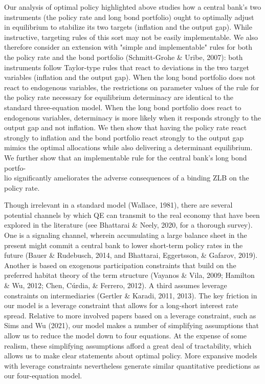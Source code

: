\documentclass[10pt]{article}
\begin{document}
Our analysis of optimal policy highlighted above studies how a central bank's two instruments (the policy rate and long bond portfolio) ought to optimally adjust in equilibrium to stabilize its two targets (inflation and the output gap). While instructive, targeting rules of this sort may not be easily implementable. We also therefore consider an extension with "simple and implementable" rules for both the policy rate and the bond portfolio (Schmitt-Grohe \& Uribe, 2007): both instruments follow Taylor-type rules that react to deviations in the two target variables (inflation and the output gap). When the long bond portfolio does not react to endogenous variables, the restrictions on parameter values of the rule for the policy rate necessary for equilibrium determinacy are identical to the standard three-equation model. When the long bond portfolio does react to endogenous variables, determinacy is more likely when it responds strongly to the output gap and not inflation. We then show that having the policy rate react strongly to inflation and the bond portfolio react strongly to the output gap mimics the optimal allocations while also delivering a determinant equilibrium. We further show that an implementable rule for the central bank's long bond portfo-\\
lio significantly ameliorates the adverse consequences of a binding ZLB on the policy rate.

Though irrelevant in a standard model (Wallace, 1981), there are several potential channels by which QE can transmit to the real economy that have been explored in the literature (see Bhattarai \& Neely, 2020, for a thorough survey). One is a signaling channel, wherein accumulating a large balance sheet in the present might commit a central bank to lower short-term policy rates in the future (Bauer \& Rudebusch, 2014, and Bhattarai, Eggertsson, \& Gafarov, 2019). Another is based on exogenous participation constraints that build on the preferred habitat theory of the term structure (Vayanos \& Vila, 2009; Hamilton \& Wu, 2012; Chen, Cúrdia, \& Ferrero, 2012). A third assumes leverage constraints on intermediaries (Gertler \& Karadi, 2011, 2013). The key friction in our model is a leverage constraint that allows for a long-short interest rate spread. Relative to more involved papers based on a leverage constraint, such as Sims and Wu (2021), our model makes a number of simplifying assumptions that allow us to reduce the model down to four equations. At the expense of some realism, these simplifying assumptions afford a great deal of tractability, which allows us to make clear statements about optimal policy. More expansive models with leverage constraints nevertheless generate similar quantitative predictions as our four-equation model.
\end{document}
